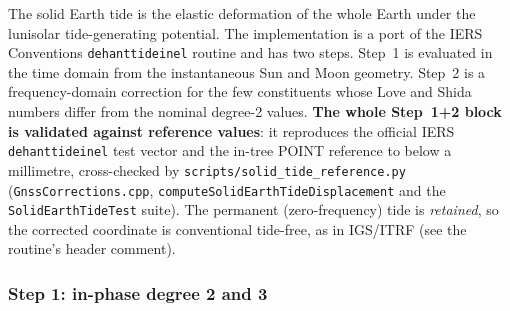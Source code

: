 \documentclass[main.tex]{subfiles}
\begin{document}
The solid Earth tide is the elastic deformation of the whole Earth under
the lunisolar tide-generating potential.  The implementation is a port
of the IERS Conventions \texttt{dehanttideinel} routine \cite{iers2010}
and has two steps.  Step~1 is evaluated in the time domain from the
instantaneous Sun and Moon geometry.  Step~2 is a frequency-domain
correction for the few constituents whose Love and Shida numbers differ
from the nominal degree-2 values.  \textbf{The whole Step~1+2 block is
validated against reference values}: it reproduces the official IERS
\texttt{dehanttideinel} test vector and the in-tree POINT reference to
below a millimetre, cross-checked by
\texttt{scripts/solid\_tide\_reference.py}
(\texttt{GnssCorrections.cpp}, \texttt{computeSolidEarthTideDisplacement} and
the \texttt{SolidEarthTideTest} suite).  The permanent (zero-frequency)
tide is \emph{retained}, so the corrected coordinate is conventional
tide-free, as in IGS/ITRF (see the routine's header comment).

\subsubsection{Step 1: in-phase degree 2 and 3}
\end{document}
